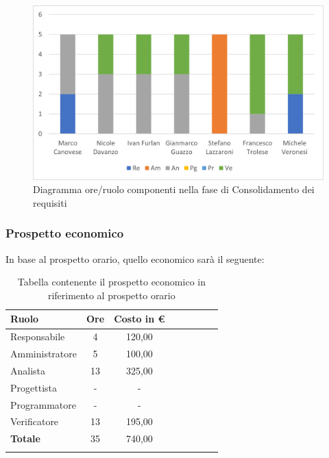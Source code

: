 \begin{figure}[H]
	\centering
	\includegraphics[width=0.8\linewidth]{res/images/preventivo/2-1.png}
	\caption{Diagramma ore/ruolo componenti nella fase di Consolidamento dei requisiti}
	\label{fig:diagramma suddivisione ruoli fase conslidamento dei requisiti}
\end{figure}

\subsubsection{Prospetto economico}
In base al prospetto orario, quello economico sarà il seguente:

\begin{longtable}{|l|c|c|c|c|c|c|c|}
	\hline
	\rowcolor{lighter-grayer}
	\textbf{Ruolo}  & \textbf{Ore} & \textbf{Costo in €} \\
	\hline
	\endfirsthead

	\hline
	Responsabile    & 4            & 120,00              \\
	\hline
	\hline
	Amministratore  & 5            & 100,00              \\
	\hline
	\hline
	Analista        & 13           & 325,00              \\
	\hline
	\hline
	Progettista     & -            & -                   \\
	\hline
	\hline
	Programmatore   & -            & -                   \\
	\hline
	\hline
	Verificatore    & 13           & 195,00              \\
	\hline
	\hline
	\textbf{Totale} & 35           & 740,00              \\
	\hline
	\rowcolor{white}
	\caption{Tabella contenente il prospetto economico in riferimento al prospetto orario}
\end{longtable}
\pagebreak

